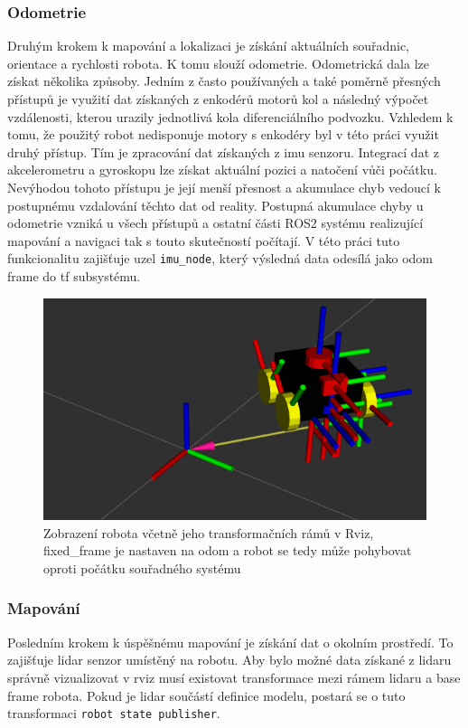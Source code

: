 \subsubsection*{Odometrie}
Druhým krokem k mapování a lokalizaci je získání aktuálních souřadnic, orientace a rychlosti robota. K tomu slouží odometrie. Odometrická dala lze získat několika způsoby. Jedním z často používaných a také poměrně přesných přístupů je využití dat získaných z enkodérů motorů kol a následný výpočet vzdálenosti, kterou urazily jednotlivá kola diferenciálního podvozku. Vzhledem k tomu, že použitý robot nedisponuje motory s enkodéry byl v této práci využit druhý přístup. Tím je zpracování dat získaných z imu senzoru. Integrací dat z akcelerometru a gyroskopu lze získat aktuální pozici a natočení vůči počátku. Nevýhodou tohoto přístupu je její menší přesnost a akumulace chyb vedoucí k postupnému vzdalování těchto dat od reality. Postupná akumulace chyby u odometrie vzniká u všech přístupů a ostatní části ROS2 systému realizující mapování a navigaci tak s touto skutečností počítají. V této práci tuto funkcionalitu zajišťuje uzel \verb|imu_node|, který výsledná data odesílá jako odom frame do tf subsystému. 

\begin{figure}[h!]
	\centering
	\includegraphics[scale=0.5]{obrazky-figures/odom.png}
	\caption{Zobrazení robota včetně jeho transformačních rámů v Rviz, fixed\_frame je nastaven na odom a robot se tedy může pohybovat oproti počátku souřadného systému}
	\label{}
\end{figure}

\subsubsection*{Mapování}
Posledním krokem k úspěšnému mapování je získání dat o okolním prostředí. To zajišťuje lidar senzor umístěný na robotu. Aby bylo možné data získané z lidaru správně vizualizovat v rviz musí existovat transformace mezi rámem lidaru a base frame robota. Pokud je lidar součástí definice modelu, postará se o tuto transformaci \verb|robot state publisher|.

